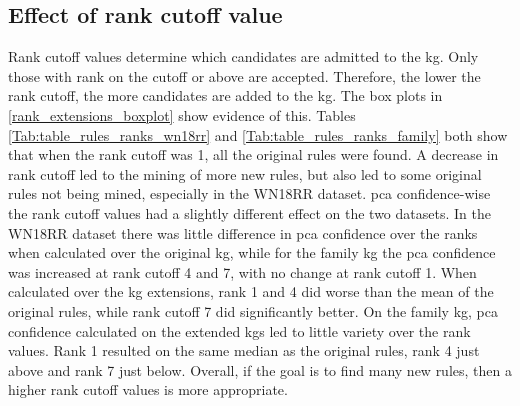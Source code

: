 \fi




\newpage
\subsection{Effect of rank cutoff value}
Rank cutoff values determine which candidates are admitted to the \gls{kg}. Only those with rank on the cutoff or above are accepted. Therefore, the lower the rank cutoff, the more candidates are added to the \gls{kg}. The box plots in \cref{rank_extensions_boxplot} show evidence of this. Tables \ref{Tab:table_rules_ranks_wn18rr} and \ref{Tab:table_rules_ranks_family} both show that when the rank cutoff was 1, all the original rules were found. A decrease in rank cutoff led to the mining of more new rules, but also led to some original rules not being mined, especially in the WN18RR dataset. \gls{pca} confidence-wise the rank cutoff values had a slightly different effect on the two datasets. In the WN18RR dataset there was little difference in \gls{pca} confidence over the ranks when calculated over the original \gls{kg}, while for the family \gls{kg} the \gls{pca} confidence was increased at rank cutoff 4 and 7, with no change at rank cutoff 1. When calculated over the \gls{kg} extensions, rank 1 and 4 did worse than the mean of the original rules, while rank cutoff 7 did significantly better. On the family \gls{kg}, \gls{pca} confidence calculated on the extended \glspl{kg} led to little variety over the rank values. Rank 1 resulted on the same median as the original rules, rank 4 just above and rank 7 just below. Overall, if the goal is to find many new rules, then a higher rank cutoff values is more appropriate.

